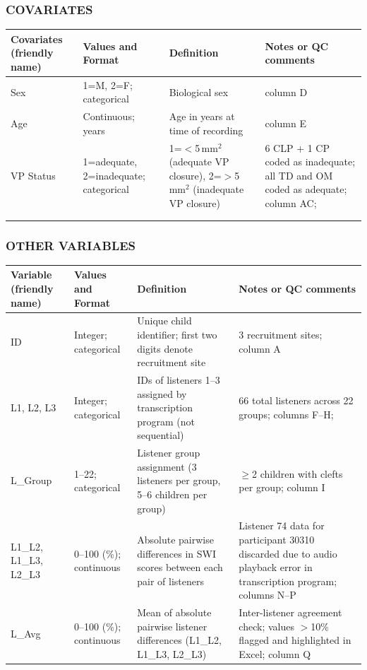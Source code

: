 \documentclass{article}
\begin{document}
\subsubsection*{COVARIATES}
\begin{tabular}{p{2cm} p{2cm} p{5cm} p{5cm}}
\toprule
\textbf{Covariates (friendly name)} & \textbf{Values and Format} & \textbf{Definition} & \textbf{Notes or QC comments} \\
\midrule
Sex & 1=M, 2=F; categorical & Biological sex & column D \\[1em]
Age & Continuous; years & Age in years at time of recording & column E \\[1em]
VP Status & 1=adequate, 2=inadequate; categorical & 1=$<$5\,mm$^2$ (adequate VP closure), 2=$>$5\,mm$^2$ (inadequate VP closure) & 6 CLP + 1 CP coded as inadequate; all TD and OM coded as adequate; column AC;  \\[1em]
& & & \\[1em]
& & & \\
\bottomrule
\end{tabular}

\subsubsection*{OTHER VARIABLES}
\begin{tabular}{p{2cm} p{2cm} p{5cm} p{5cm}}
\toprule
\textbf{Variable (friendly name)} & \textbf{Values and Format} & \textbf{Definition} & \textbf{Notes or QC comments} \\
\midrule
ID & Integer; categorical & Unique child identifier; first two digits denote recruitment site & 3 recruitment sites; column A\\[1em]
L1, L2, L3 & Integer; categorical & IDs of listeners 1--3 assigned by transcription program (not sequential) & 66 total listeners across 22 groups; columns F--H; \\[1em]
L\_Group & 1--22; categorical & Listener group assignment (3 listeners per group, 5--6 children per group) & $\geq$2 children with clefts per group; column I\\[1em]
L1\_L2, L1\_L3, L2\_L3 & 0--100 (\%); continuous & Absolute pairwise differences in SWI scores between each pair of listeners & Listener 74 data for participant 30310 discarded due to audio playback error in transcription program; columns N--P \\[1em]
L\_Avg & 0--100 (\%); continuous & Mean of absolute pairwise listener differences (L1\_L2, L1\_L3, L2\_L3) & Inter-listener agreement check; values $>$10\% flagged and highlighted in Excel;  column Q \\
\bottomrule
\end{tabular}
\end{document}
